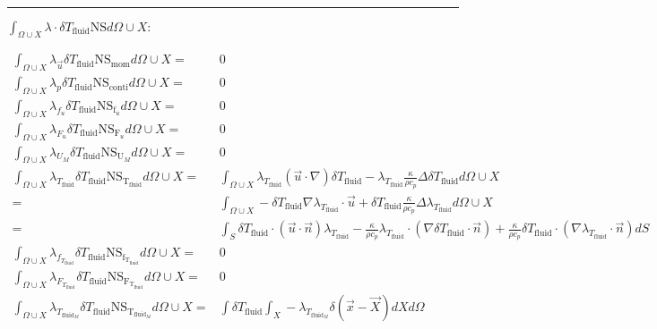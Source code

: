 \documentclass[10pt]{article} %
\begin{document}
\begin{center}
\begin{align*}
\end{align*}
\noindent\rule[1ex]{\textwidth}{1pt}
\begin{flushleft}
	$\int_{\Omega \cup X} \lambda \cdot \delta T_{\text{fluid}} \text{NS}d\Omega \cup X :$
\end{flushleft}
\begin{align*}
	\int_{\Omega \cup X} \lambda_{\vec{u}} \delta T_{\text{fluid}} \text{NS}_{\text{mom}} d\Omega \cup X =&  0\\
	\int_{\Omega \cup X} \lambda_p \delta T_{\text{fluid}} \text{NS}_{\text{conti}} d\Omega \cup X =& 0\\
	\int_{\Omega \cup X} \lambda_{f_u} \delta T_{\text{fluid}} \text{NS}_{\text{f}_u} d\Omega \cup X =& 0\\
	\int_{\Omega \cup X} \lambda_{F_u} \delta T_{\text{fluid}} \text{NS}_{\text{F}_u} d\Omega \cup X =& 0\\
	\int_{\Omega \cup X} \lambda_{U_M} \delta T_{\text{fluid}} \text{NS}_{\text{U}_M} d\Omega \cup X =& 0\\
	\int_{\Omega \cup X} \lambda_{T_{\text{fluid}}} \delta T_{\text{fluid}} \text{NS}_{\text{T}_{\text{fluid}}} d\Omega \cup X 
	=&\int_{\Omega \cup X} \lambda_{T_{\text{fluid}}} (\vec{u} \cdot \nabla) \delta T_{\text{fluid}} - \lambda_{T_{\text{fluid}}} \frac{\kappa}{\rho c_p} \Delta \delta T_{\text{fluid}} d\Omega \cup X\\
	=&\int_{\Omega \cup X} - \delta T_{\text{fluid}} \nabla \lambda_{T_{\text{fluid}}} \cdot \vec{u} + \delta T_{\text{fluid}} \frac{\kappa}{\rho c_p} \Delta  \lambda_{T_{\text{fluid}}} d\Omega \cup X\\
	=&\int_{S} \delta T_{\text{fluid}} \cdot \left(\vec{u}\cdot \vec{n}\right) \lambda_{T_{\text{fluid}}} - \frac{\kappa}{\rho c_p} \lambda_{T_{\text{fluid}}} \cdot \left(\nabla \delta T_{\text{fluid}} \cdot \vec{n}\right) + \frac{\kappa}{\rho c_p} \delta T_{\text{fluid}} \cdot \left(\nabla \lambda_{T_{\text{fluid}}} \cdot \vec{n}\right) dS\\
	\int_{\Omega \cup X} \lambda_{f_{T_{\text{fluid}}}} \delta T_{\text{fluid}} \text{NS}_{\text{f}_{\text{T}_{\text{fluid}}}} d\Omega \cup X =& 0\\
	\int_{\Omega \cup X} \lambda_{F_{T_{\text{fluid}}}} \delta T_{\text{fluid}} \text{NS}_{\text{F}_{\text{T}_{\text{fluid}}}} d\Omega \cup X =& 0\\
	\int_{\Omega \cup X} \lambda_{T_{\text{fluid}_M}} \delta T_{\text{fluid}} \text{NS}_{\text{T}_{\text{fluid}_M}} d\Omega \cup X 
	=& \int \delta T_{\text{fluid}} \int_{X} -\lambda_{T_{\text{fluid}_M}} \delta (\vec{x}-\vec{X}) dX d\Omega\\

\end{align*}
\end{center}
\end{document}

